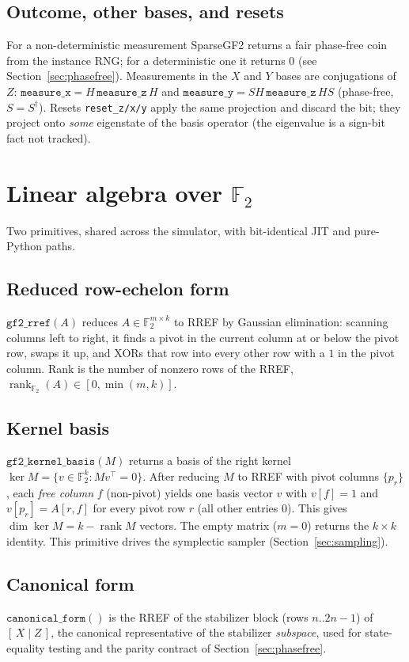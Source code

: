 \documentclass[11pt]{article}
\theoremstyle{definition}
\theoremstyle{plain}
\newcommand{\F}{\mathbb{F}}
\newcommand{\rank}{\operatorname{rank}}
\newcommand{\code}{\textsf{\small SparseGF2}}
\begin{document}
\subsection{Outcome, other bases, and resets}
For a non-deterministic measurement \code{} returns a fair phase-free coin from
the instance RNG; for a deterministic one it returns $0$ (see
Section~\ref{sec:phasefree}). Measurements in the $X$ and $Y$ bases are
conjugations of $Z$: $\texttt{measure\_x}=H\,\texttt{measure\_z}\,H$ and
$\texttt{measure\_y}=SH\,\texttt{measure\_z}\,HS$ (phase-free, $S=S^\dagger$).
Resets \texttt{reset\_z/x/y} apply the same projection and discard the bit; they
project onto \emph{some} eigenstate of the basis operator (the eigenvalue is a
sign-bit fact not tracked).

\section{Linear algebra over \texorpdfstring{$\F_2$}{F2}}
\label{sec:linalg}

Two primitives, shared across the simulator, with bit-identical JIT and
pure-Python paths.

\subsection{Reduced row-echelon form}
$\texttt{gf2\_rref}(A)$ reduces $A\in\F_2^{m\times k}$ to RREF by Gaussian
elimination: scanning columns left to right, it finds a pivot in the current
column at or below the pivot row, swaps it up, and XORs that row into every
other row with a $1$ in the pivot column. Rank is the number of nonzero rows of
the RREF, $\rank_{\F_2}(A)\in[0,\min(m,k)]$.

\subsection{Kernel basis}
$\texttt{gf2\_kernel\_basis}(M)$ returns a basis of the right kernel
$\ker M=\{v\in\F_2^k: Mv^{\!\top}=0\}$. After reducing $M$ to RREF with pivot
columns $\{p_r\}$, each \emph{free column} $f$ (non-pivot) yields one basis
vector $v$ with $v[f]=1$ and $v[p_r]=A[r,f]$ for every pivot row $r$ (all other
entries $0$). This gives $\dim\ker M=k-\rank M$ vectors. The empty matrix
($m=0$) returns the $k\times k$ identity. This primitive drives the symplectic
sampler (Section~\ref{sec:sampling}).

\subsection{Canonical form}
$\texttt{canonical\_form}()$ is the RREF of the stabilizer block (rows
$n..2n{-}1$) of $[\,X\mid Z\,]$, the canonical representative of the stabilizer
\emph{subspace}, used for state-equality testing and the parity contract of
Section~\ref{sec:phasefree}.
\end{document}
